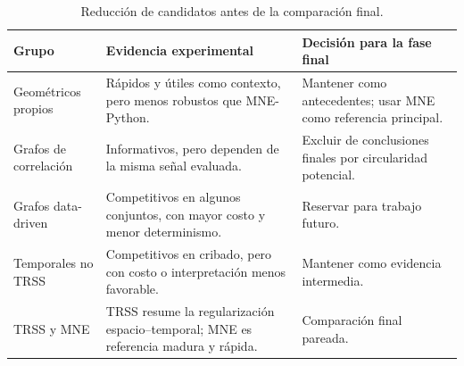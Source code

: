 \begin{table}[H]
\centering
\scriptsize
\setlength{\tabcolsep}{3pt}
\caption{Reducción de candidatos antes de la comparación final.}
\label{tab:ch4_candidate_reduction_decisions}
\begin{tabular}{@{}p{2.9cm}p{4.1cm}p{4.0cm}@{}}
\toprule
Grupo & Evidencia experimental & Decisión para la fase final \\
\midrule
Geométricos propios & Rápidos y útiles como contexto, pero menos robustos que MNE-Python. & Mantener como antecedentes; usar MNE como referencia principal. \\
Grafos de correlación & Informativos, pero dependen de la misma señal evaluada. & Excluir de conclusiones finales por circularidad potencial. \\
Grafos data-driven & Competitivos en algunos conjuntos, con mayor costo y menor determinismo. & Reservar para trabajo futuro. \\
Temporales no TRSS & Competitivos en cribado, pero con costo o interpretación menos favorable. & Mantener como evidencia intermedia. \\
TRSS y MNE & TRSS resume la regularización espacio--temporal; MNE es referencia madura y rápida. & Comparación final pareada. \\
\bottomrule
\end{tabular}
\end{table}
